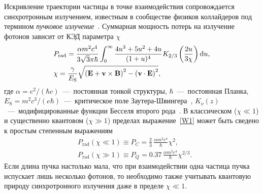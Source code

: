 Искривление траектории частицы в точке взаимодействия сопровождается синхротронным излучением, известным в сообществе физиков коллайдеров под термином \textit{пучковое излучение}~\cite{blankenbecler1987quantum,chen1988introduction}.
Суммарная мощность потерь на излучение фотонов зависит от КЭД параметра $\chi$~\cite{ritus1985quantum,Berestetskii82,Baier98}
\begin{align}
    \label{W1}
    &P_\text{rad} = \frac{\alpha m^{2}c^{4}}{3 \sqrt{3}\pi\hbar}
    \int_{0}^{\infty}\frac{4u^{3}+5u^2+4u}{(1+u)^{4}}K_{2/3}\left(\frac{2u}
    {3\chi}\right) \dd u, \\
    \label{chi}
    &\chi = \frac{\gamma}{E_\mathrm{S}}
    \sqrt{\left(\vb{E}+\vb{v}\times\vb{\vb{B}}\right)^{2}-\left(\vb{v}\cdot\vb{\vb{E}}\right)^{2}},
\end{align}
где $\alpha=e^2/(\hbar c)$~---~постоянная тонкой структуры, $\hbar$~---~постоянная Планка, $E_\mathrm{S}= m^2 c^3 /(e\hbar)$~---~критическое поле Заутера-Швингера~\cite{Berestetskii82}, $K_{\nu}(z)$~---~модифицированные функции Бесселя второго рода~\cite{abramowitz1964handbook}.
В классическом (${\chi \ll 1}$) и существенно квантовом (${\chi \gg 1}$) пределах выражение~\eqref{W1} может быть сведено к простым степенным выражениям
\begin{align}
    \label{W2}
    &P_\text{rad}(\chi\ll1) \equiv P_C =  \frac{2}{3}\, \frac{\alpha m^{2}c^{4}} {\hbar}\chi^2,\\
    \label{W3}
    &P_\text{rad}(\chi\gg1) \equiv P_Q =  0.37\, \frac{\alpha m^{2}c^{4}}{\hbar} \chi^{2/3}.
\end{align}
Если длина пучка настолько мала, что при взаимодействии одна частица пучка испускает лишь несколько фотонов, то необходимо также учитывать квантовую природу синхротронного излучения даже в пределе $\chi \ll 1$.

